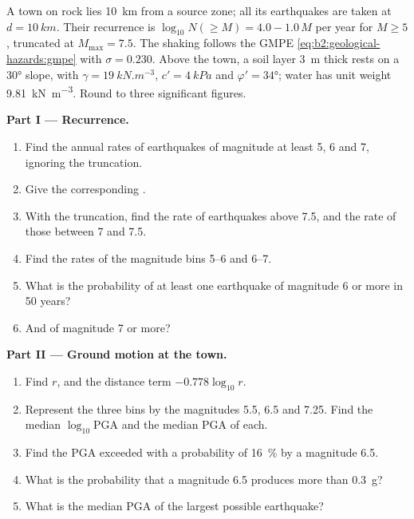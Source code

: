 \begin{problem}\label{pb:b2:geological-hazards:1}
A town on rock lies \qty{10}{km} from a source zone; all its earthquakes are taken at
$d = \qty{10}{km}$. Their recurrence is $\log_{10} N(\geq M) = 4.0 - 1.0\,M$ per year for $M \geq 5$,
truncated at $M_{\max} = 7.5$. The shaking follows the GMPE \eqref{eq:b2:geological-hazards:gmpe}
with $\sigma = 0.230$. Above the town, a soil layer \qty{3}{m} thick rests on a \ang{30} slope,
with $\gamma = \qty{19}{kN.m^{-3}}$, $c' = \qty{4}{kPa}$ and $\varphi' = \ang{34}$; water has unit
weight \qty{9.81}{kN.m^{-3}}. Round to three significant figures.

\noindent\textbf{Part I --- Recurrence.}
\begin{enumerate}
  \item Find the annual rates of earthquakes of magnitude at least 5, 6 and 7, ignoring the
        truncation.
  \item Give the corresponding .
  \item With the truncation, find the rate of earthquakes above 7.5, and the rate of those between 7
        and 7.5.
  \item Find the rates of the magnitude bins 5--6 and 6--7.
  \item What is the probability of at least one earthquake of magnitude 6 or more in 50 years?
  \item And of magnitude 7 or more?
\end{enumerate}

\noindent\textbf{Part II --- Ground motion at the town.}
\begin{enumerate}[resume]
  \item Find $r$, and the distance term $-0.778\log_{10} r$.
  \item Represent the three bins by the magnitudes 5.5, 6.5 and 7.25. Find the median
        $\log_{10}\mathrm{PGA}$ and the median PGA of each.
  \item Find the PGA exceeded with a probability of \qty{16}{\percent} by a magnitude 6.5.
  \item What is the probability that a magnitude 6.5 produces more than \qty{0.3}{g}?
  \item What is the median PGA of the largest possible earthquake?
\end{enumerate}


\end{problem}
